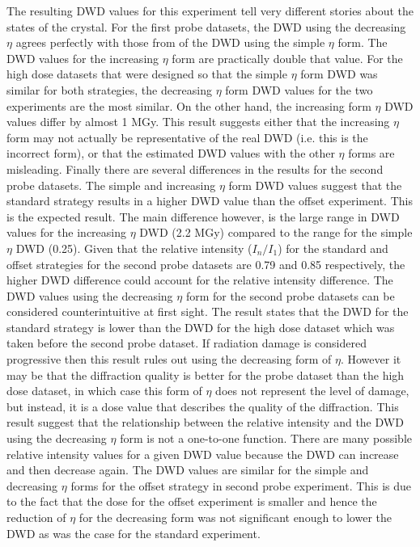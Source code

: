 The resulting DWD values for this experiment tell very different stories about the states of the crystal.
For the first probe datasets, the DWD using the decreasing $\eta$ agrees perfectly with those from of the DWD using the simple $\eta$ form.
The DWD values for the increasing $\eta$ form are practically double that value.
For the high dose datasets that were designed so that the simple $\eta$ form DWD was similar for both strategies, the decreasing $\eta$ form DWD values for the two experiments are the most similar.
On the other hand, the increasing form $\eta$ DWD values differ by almost 1 MGy.
This result suggests either that the increasing $\eta$ form may not actually be representative of the real DWD (i.e. this is the incorrect form), or that the estimated DWD values with the other $\eta$ forms are misleading.
Finally there are several differences in the results for the second probe datasets.
The simple and increasing $\eta$ form DWD values suggest that the standard strategy results in a higher DWD value than the offset experiment.
This is the expected result.
The main difference however, is the large range in DWD values for the increasing $\eta$ DWD (2.2 MGy) compared to the range for the simple $\eta$ DWD (0.25).
Given that the relative intensity ($I_{n}/I_{1}$) for the standard and offset strategies for the second probe datasets are 0.79 and 0.85 respectively, the higher DWD difference could account for the relative intensity difference.
The DWD values using the decreasing $\eta$ form for the second probe datasets can be considered counterintuitive at first sight.
The result states that the DWD for the standard strategy is lower than the DWD for the high dose dataset which was taken before the second probe dataset.
If radiation damage is considered progressive then this result rules out using the decreasing form of $\eta$.
However it may be that the diffraction quality is better for the probe dataset than the high dose dataset, in which case this form of $\eta$ does not represent the level of damage, but instead, it is a dose value that describes the quality of the diffraction.
This result suggest that the relationship between the relative intensity and the DWD using the decreasing $\eta$ form is not a one-to-one function.
There are many possible relative intensity values for a given DWD value because the DWD can increase and then decrease again.
The DWD values are similar for the simple and decreasing $\eta$ forms for the offset strategy in second probe experiment.
This is due to the fact that the dose for the offset experiment is smaller and hence the reduction of $\eta$ for the decreasing form was not significant enough to lower the DWD as was the case for the standard experiment.
